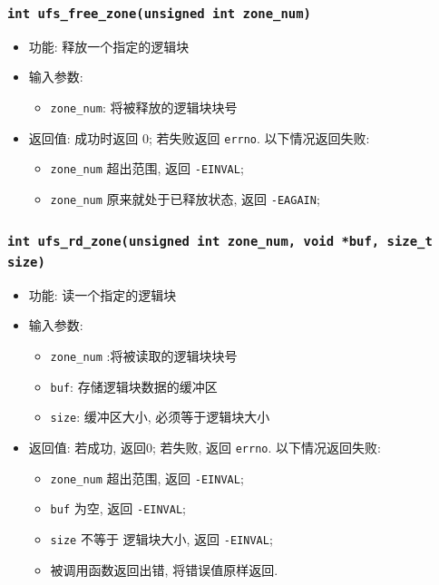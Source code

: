 \documentclass[nofonts]{ctexart}
\begin{document}
  \subsubsection{\texttt{int ufs\_free\_zone(unsigned int zone\_num)}}
  \begin{itemize}
\item
  功能: 释放一个指定的逻辑块
\item
  输入参数:

  \begin{itemize}
  \item
    \texttt{zone\_num}: 将被释放的逻辑块块号
  \end{itemize}
\item
  返回值: 成功时返回 0; 若失败返回 \texttt{errno}. 以下情况返回失败:

  \begin{itemize}
  \item
    \texttt{zone\_num} 超出范围, 返回 \texttt{-EINVAL};
  \item
    \texttt{zone\_num} 原来就处于已释放状态, 返回 \texttt{-EAGAIN};
  \end{itemize}
  \end{itemize}
  \subsubsection{\texttt{int ufs\_rd\_zone(unsigned int zone\_num, void *buf, size\_t size)}}
  \begin{itemize}
\item
  功能: 读一个指定的逻辑块
\item
  输入参数:

  \begin{itemize}
  \item
    \texttt{zone\_num} :将被读取的逻辑块块号
  \item
    \texttt{buf}: 存储逻辑块数据的缓冲区
  \item
    \texttt{size}: 缓冲区大小, 必须等于逻辑块大小
  \end{itemize}
\item
  返回值: 若成功, 返回0; 若失败, 返回 \texttt{errno}. 以下情况返回失败:

  \begin{itemize}
  \item
    \texttt{zone\_num} 超出范围, 返回 \texttt{-EINVAL};
  \item
    \texttt{buf} 为空, 返回 \texttt{-EINVAL};
  \item
    \texttt{size} 不等于 逻辑块大小, 返回 \texttt{-EINVAL};
  \item
    被调用函数返回出错, 将错误值原样返回.
  \end{itemize}
  \end{itemize}
\end{document}
